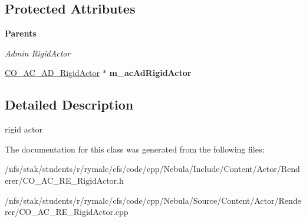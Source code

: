 \subsection*{Protected Attributes}
\begin{Indent}{\bf Parents}\par
{\em \label{_amgrp9dafe3747e06aa15af0bfba521f66346}
 Admin RigidActor }\begin{DoxyCompactItemize}
\item 
\hypertarget{classContent_1_1Actor_1_1Renderer_1_1RigidActor_a759890ea32d38a222da90b5c18275156}{
\hyperlink{classContent_1_1Actor_1_1Admin_1_1RigidActor}{CO\_\-AC\_\-AD\_\-RigidActor} $\ast$ {\bfseries m\_\-acAdRigidActor}}
\label{classContent_1_1Actor_1_1Renderer_1_1RigidActor_a759890ea32d38a222da90b5c18275156}

\end{DoxyCompactItemize}
\end{Indent}


\subsection{Detailed Description}
rigid actor 

The documentation for this class was generated from the following files:\begin{DoxyCompactItemize}
\item 
/nfs/stak/students/r/rymalc/cfs/code/cpp/Nebula/Include/Content/Actor/Renderer/CO\_\-AC\_\-RE\_\-RigidActor.h\item 
/nfs/stak/students/r/rymalc/cfs/code/cpp/Nebula/Source/Content/Actor/Renderer/CO\_\-AC\_\-RE\_\-RigidActor.cpp\end{DoxyCompactItemize}
